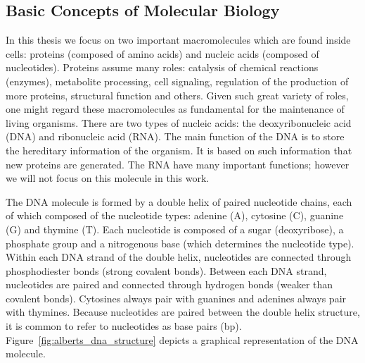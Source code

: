 \subsection{Basic Concepts of Molecular Biology}
\label{sec:basic.concepts.molecular.biology}

In this thesis we focus on two important macromolecules which are found inside cells: proteins (composed of amino acids) and nucleic acids (composed of nucleotides). Proteins assume many roles: catalysis of chemical reactions (enzymes), metabolite processing, cell signaling, regulation of the production of more proteins, structural function and others. Given such great variety of roles, one might regard these macromolecules as fundamental for the maintenance of living organisms. There are two types of nucleic acids: the deoxyribonucleic acid (DNA) and ribonucleic acid (RNA). The main function of the DNA is to store the hereditary information of the organism. It is based on such information that new proteins are generated. The RNA have many important functions; however we will not focus on this molecule in this work.

The DNA molecule is formed by a double helix of paired nucleotide chains, each of which composed of the nucleotide types: adenine (A), cytosine (C), guanine (G) and thymine (T). Each nucleotide is composed of a sugar (deoxyribose), a phosphate group and a nitrogenous base (which determines the nucleotide type). Within each DNA strand of the double helix, nucleotides are connected through phosphodiester bonds (strong covalent bonds). Between each DNA strand, nucleotides are paired and connected through hydrogen bonds (weaker than covalent bonds). Cytosines always pair with guanines and adenines always pair with thymines. Because nucleotides are paired between the double helix structure, it is common to refer to nucleotides as base pairs (bp). Figure~\ref{fig:alberts_dna_structure} depicts a graphical representation of the DNA molecule.

